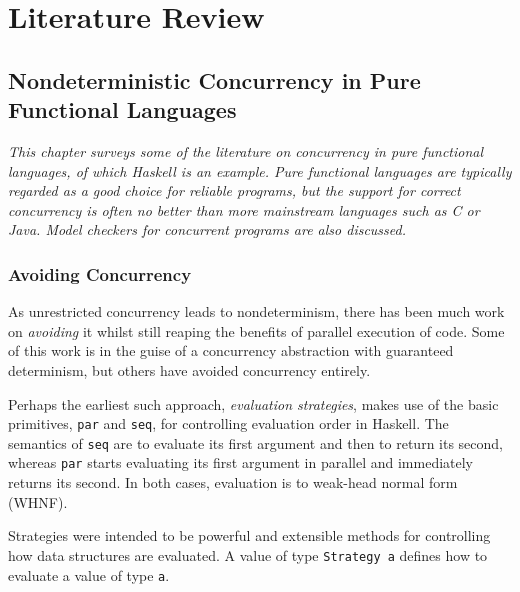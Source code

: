 \part{Literature Review}


\chapter{Nondeterministic Concurrency in Pure Functional Languages}
\label{chp:litrev}

\textit{This chapter surveys some of the literature on concurrency in
  pure functional languages, of which Haskell is an example. Pure
  functional languages are typically regarded as a good choice for
  reliable programs, but the support for correct concurrency is often
  no better than more mainstream languages such as C or Java. Model
  checkers for concurrent programs are also discussed.}

\section{Avoiding Concurrency}
\label{sec:litrev-strategies}

As unrestricted concurrency leads to nondeterminism, there has been
much work on \textit{avoiding} it whilst still reaping the benefits of
parallel execution of code. Some of this work is in the guise of a
concurrency abstraction with guaranteed determinism, but others have
avoided concurrency entirely.

Perhaps the earliest such approach, \textit{evaluation
  strategies}\cite{trinder}, makes use of the basic primitives,
\verb|par| and \verb|seq|, for controlling evaluation order in
Haskell. The semantics of \verb|seq| are to evaluate its first
argument and then to return its second, whereas \verb|par| starts
evaluating its first argument in parallel and immediately returns its
second. In both cases, evaluation is to weak-head normal form (WHNF).

Strategies were intended to be powerful and extensible methods for
controlling how data structures are evaluated. A value of type
\verb|Strategy a| defines how to evaluate a value of type
\verb|a|.

